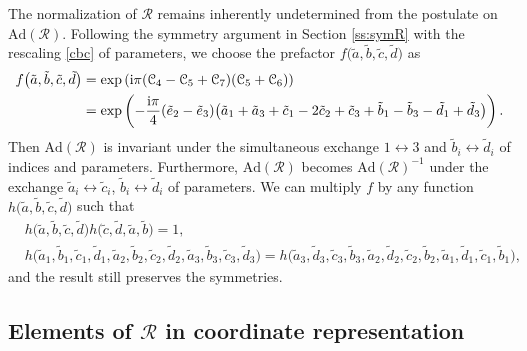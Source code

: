 \documentclass[pdftex]{sigma}
\numberwithin{equation}{section}
\begin{document}
The normalization of $\mathcal{R}$ remains inherently undetermined from the postulate on
$\mathrm{Ad}(\mathcal{R})$.
%
Following the symmetry argument in Section \ref{ss:symR} with the rescaling \eqref{cbc} of parameters,
we choose the prefactor $f\bigl({\tilde a}, {\tilde b}, {\tilde c}, {\tilde d}\bigr)$ as
\begin{align}
f\bigl(\tilde{a}, \tilde{b}, \tilde{c}, \tilde{d}\bigr)
& = \exp\left( {\rm i} \pi (\mathcal{C}_4-\mathcal{C}_5+\mathcal{C}_7)(\mathcal{C}_5+\mathcal{C}_6)\right)\nonumber
\\
&=\exp\left( -\frac{{\rm i}\pi }{4}(\tilde{e}_2-\tilde{e}_3)\bigl(\tilde{a}_1+\tilde{a}_3+\tilde{c}_1-2\tilde{c}_2+\tilde{c}_3
+\tilde{b}_1-\tilde{b}_3-\tilde{d}_1+\tilde{d}_3\bigr)\right).\label{fc}
\end{align}
Then $\mathrm{Ad}(\mathcal{R})$ is invariant under the simultaneous
exchange $1 \leftrightarrow 3$ and
${\tilde b}_i \leftrightarrow {\tilde d}_i$ of indices and parameters.
Furthermore, $\mathrm{Ad}(\mathcal{R})$ becomes
$\mathrm{Ad}(\mathcal{R})^{-1}$ under the exchange
${\tilde a}_i \leftrightarrow {\tilde c}_i$,
${\tilde b}_i \leftrightarrow {\tilde d}_i$ of parameters. We can
multiply $f$ by any function
$h\bigl(\tilde{a}, \tilde{b}, \tilde{c}, \tilde{d}\bigr)$ such that
\begin{align*}
&h\bigl(\tilde{a}, \tilde{b}, \tilde{c}, \tilde{d}\bigr)h\bigl(\tilde{c}, \tilde{d}, \tilde{a}, \tilde{b}\bigr)=1,
\\
&h\bigl(\tilde{a}_1, \tilde{b}_1, \tilde{c}_1, \tilde{d}_1,
\tilde{a}_2, \tilde{b}_2, \tilde{c}_2, \tilde{d}_2,
\tilde{a}_3, \tilde{b}_3, \tilde{c}_3, \tilde{d}_3\bigr)
=
h\bigl(\tilde{a}_3, \tilde{d}_3, \tilde{c}_3, \tilde{b}_3,
\tilde{a}_2, \tilde{d}_2, \tilde{c}_2, \tilde{b}_2,
\tilde{a}_1, \tilde{d}_1, \tilde{c}_1, \tilde{b}_1\bigr),
\end{align*}
and the result still preserves the symmetries.

\subsection[Elements of R in coordinate representation]{Elements of $\boldsymbol{\mathcal{R}}$ in coordinate representation}\label{ss:cr}
\end{document}
